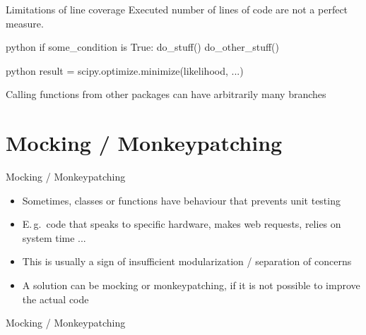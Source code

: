 \begin{frame}[c, fragile]{Limitations of line coverage}
  Executed number of lines of code are not a perfect measure.
  \begin{code}{python}
    if some_condition is True:
        do_stuff()
    do_other_stuff()
  \end{code}



  \begin{code}{python}
    result = scipy.optimize.minimize(likelihood, ...)
  \end{code}

  Calling functions from other packages can have arbitrarily many branches
\end{frame}

\section{Mocking / Monkeypatching}
\begin{frame}[c]{Mocking / Monkeypatching}
  \begin{itemize}
    \item Sometimes, classes or functions have behaviour that prevents unit testing
    \item E.\,g.\ code that speaks to specific hardware, makes web requests, relies on system time ...
    \item This is usually a sign of insufficient modularization / separation of concerns
    \item A solution can be mocking or monkeypatching, if it is not possible to improve the actual code
  \end{itemize}
\end{frame}

\begin{frame}[c]{Mocking / Monkeypatching}
\end{frame}

